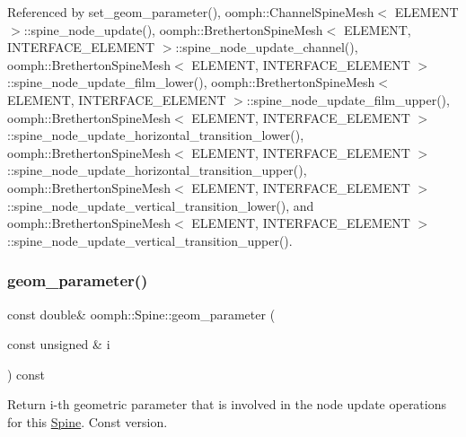Referenced by set\+\_\+geom\+\_\+parameter(), oomph\+::\+Channel\+Spine\+Mesh$<$ E\+L\+E\+M\+E\+N\+T $>$\+::spine\+\_\+node\+\_\+update(), oomph\+::\+Bretherton\+Spine\+Mesh$<$ E\+L\+E\+M\+E\+N\+T, I\+N\+T\+E\+R\+F\+A\+C\+E\+\_\+\+E\+L\+E\+M\+E\+N\+T $>$\+::spine\+\_\+node\+\_\+update\+\_\+channel(), oomph\+::\+Bretherton\+Spine\+Mesh$<$ E\+L\+E\+M\+E\+N\+T, I\+N\+T\+E\+R\+F\+A\+C\+E\+\_\+\+E\+L\+E\+M\+E\+N\+T $>$\+::spine\+\_\+node\+\_\+update\+\_\+film\+\_\+lower(), oomph\+::\+Bretherton\+Spine\+Mesh$<$ E\+L\+E\+M\+E\+N\+T, I\+N\+T\+E\+R\+F\+A\+C\+E\+\_\+\+E\+L\+E\+M\+E\+N\+T $>$\+::spine\+\_\+node\+\_\+update\+\_\+film\+\_\+upper(), oomph\+::\+Bretherton\+Spine\+Mesh$<$ E\+L\+E\+M\+E\+N\+T, I\+N\+T\+E\+R\+F\+A\+C\+E\+\_\+\+E\+L\+E\+M\+E\+N\+T $>$\+::spine\+\_\+node\+\_\+update\+\_\+horizontal\+\_\+transition\+\_\+lower(), oomph\+::\+Bretherton\+Spine\+Mesh$<$ E\+L\+E\+M\+E\+N\+T, I\+N\+T\+E\+R\+F\+A\+C\+E\+\_\+\+E\+L\+E\+M\+E\+N\+T $>$\+::spine\+\_\+node\+\_\+update\+\_\+horizontal\+\_\+transition\+\_\+upper(), oomph\+::\+Bretherton\+Spine\+Mesh$<$ E\+L\+E\+M\+E\+N\+T, I\+N\+T\+E\+R\+F\+A\+C\+E\+\_\+\+E\+L\+E\+M\+E\+N\+T $>$\+::spine\+\_\+node\+\_\+update\+\_\+vertical\+\_\+transition\+\_\+lower(), and oomph\+::\+Bretherton\+Spine\+Mesh$<$ E\+L\+E\+M\+E\+N\+T, I\+N\+T\+E\+R\+F\+A\+C\+E\+\_\+\+E\+L\+E\+M\+E\+N\+T $>$\+::spine\+\_\+node\+\_\+update\+\_\+vertical\+\_\+transition\+\_\+upper().

\mbox{\label{classoomph_1_1Spine_ad550875853ebdf54a2e81e8bbe6efa9d}} 
\subsubsection{\texorpdfstring{geom\+\_\+parameter()}{geom\_parameter()}\hspace{0.1cm}{\footnotesize\ttfamily [2/2]}}
{\footnotesize\ttfamily const double\& oomph\+::\+Spine\+::geom\+\_\+parameter (\begin{DoxyParamCaption}\item[{const unsigned \&}]{i }\end{DoxyParamCaption}) const\hspace{0.3cm}{\ttfamily [inline]}}



Return i-\/th geometric parameter that is involved in the node update operations for this \hyperlink{classoomph_1_1Spine}{Spine}. Const version. 



